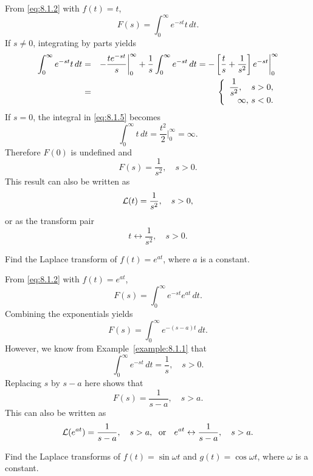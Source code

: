 \begin{examplesolution}
\solution From \eqref{eq:8.1.2} with $f(t)=t$,
\begin{equation}
  \label{eq:8.1.5}F(s)=\int_{0}^{\infty}e^{-st}t\,dt.
\end{equation}
If $s\ne0$, integrating by parts yields
\begin{eqnarray*}
  \int_{0}^{\infty}e^{-st}t\,dt&=&-\frac{te^{-st}}{s}\bigg|_{0}^{\infty} +\frac{1}{s}\int_{0}^{\infty}e^{-st}\,dt =-\left[\frac{t}{s}+\frac{1}{s^{2}}\right]e^{-st}\bigg|_{0}^{\infty} \\&=&\left\{
  \begin{array}{rr}
    \displaystyle\frac{1}{s^{2}},\quad s>0, \\
    \infty,\,s<0.
  \end{array}\right.
\end{eqnarray*}
If $s=0$, the integral in \eqref{eq:8.1.5} becomes
\[
  \int_{0}^{\infty}t\,dt=\frac{t^{2}}{2}\bigg|_{0}^{\infty}=\infty.
\]
Therefore $F(0)$ is undefined and
\[
  F(s)=\frac{1}{s^{2}},\quad s>0.
\]
This result can also be written as
\[
  {\cal L}(t)=\frac{1}{s^{2}},\quad s>0,
\]
or as the transform pair
\[
  t\leftrightarrow\frac{1}{s^{2}},\quad s>0.
\]
\end{examplesolution}

\begin{example}
  \label{example:8.1.3}\rm Find the Laplace transform of $f(t)=e^{at}$, where $a$ is a constant.
\end{example}

\begin{examplesolution}
\solution From \eqref{eq:8.1.2} with $f(t)=e^{at}$,
\[
  F(s)=\int_{0}^{\infty}e^{-st}e^{at}\,dt.
\]
Combining the exponentials yields
\[
  F(s)=\int_{0}^{\infty}e^{-(s-a)t}\,dt.
\]
However, we know from Example~\ref{example:8.1.1} that
\[
  \int_{0}^{\infty}e^{-st}\,dt=\frac{1}{s},\quad s>0.
\]
Replacing $s$ by $s-a$ here shows that
\[
  F(s)=\frac{1}{s-a},\quad s>a.
\]
This can also be written as
\[
  {\cal L}(e^{at})=\frac{1}{s-a},\quad s>a,\text{\; or \; }e^{at}\leftrightarrow\frac{1}{s-a},\quad s>a.
\]
\end{examplesolution}

\begin{example}
  \label{example:8.1.4}\rm Find the Laplace transforms of $f(t)=\sin\omega t$ and
  $g(t)=\cos\omega t$, where $\omega$ is a constant.
\end{example}

